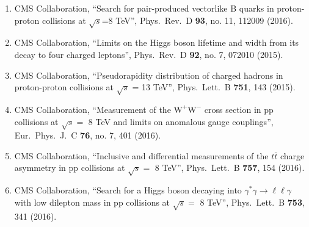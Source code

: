 \begin{enumerate}
\item CMS Collaboration, ``Search for pair-produced vectorlike B quarks in proton-proton collisions at $\sqrt{s}$=8 TeV'', Phys.\ Rev.\ D {\bf 93}, no. 11, 112009 (2016).

\item CMS Collaboration, ``Limits on the Higgs boson lifetime and width from its decay to four charged leptons'', Phys.\ Rev.\ D {\bf 92}, no. 7, 072010 (2015).

\item CMS Collaboration, ``Pseudorapidity distribution of charged hadrons in proton-proton collisions at $\sqrt{s}$ = 13 TeV'', Phys.\ Lett.\ B {\bf 751}, 143 (2015).

\item CMS Collaboration, ``Measurement of the ${{\mathrm{W} }^{+} }\mathrm{W}^{-} $ cross section in pp collisions at $\sqrt{s} =$ 8 TeV and limits on anomalous gauge couplings'', Eur.\ Phys.\ J.\ C {\bf 76}, no. 7, 401 (2016).

\item CMS Collaboration, ``Inclusive and differential measurements of the $t\overline{t}$ charge asymmetry in pp collisions at $\sqrt{s} =$ 8 TeV'', Phys.\ Lett.\ B {\bf 757}, 154 (2016).

\item CMS Collaboration, ``Search for a Higgs boson decaying into $\gamma^* \gamma \to \ell \ell \gamma$ with low dilepton mass in pp collisions at $\sqrt s = $ 8 TeV'', Phys.\ Lett.\ B {\bf 753}, 341 (2016).


\end{enumerate}
